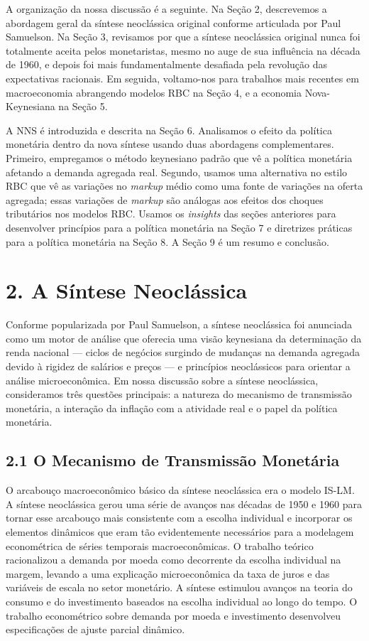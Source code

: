 \documentclass[12pt]{article}
\begin{document}
A organização da nossa discussão é a seguinte. Na Seção 2, descrevemos a abordagem geral da síntese neoclássica original conforme articulada por Paul Samuelson. Na Seção 3, revisamos por que a síntese neoclássica original nunca foi totalmente aceita pelos monetaristas, mesmo no auge de sua influência na década de 1960, e depois foi mais fundamentalmente desafiada pela revolução das expectativas racionais. Em seguida, voltamo-nos para trabalhos mais recentes em macroeconomia abrangendo modelos RBC na Seção 4, e a economia Nova-Keynesiana na Seção 5.

A NNS é introduzida e descrita na Seção 6. Analisamos o efeito da política monetária dentro da nova síntese usando duas abordagens complementares. Primeiro, empregamos o método keynesiano padrão que vê a política monetária afetando a demanda agregada real. Segundo, usamos uma alternativa no estilo RBC que vê as variações no \textit{markup} médio como uma fonte de variações na oferta agregada; essas variações de \textit{markup} são análogas aos efeitos dos choques tributários nos modelos RBC. Usamos os \textit{insights} das seções anteriores para desenvolver princípios para a política monetária na Seção 7 e diretrizes práticas para a política monetária na Seção 8. A Seção 9 é um resumo e conclusão.

\section{2. A Síntese Neoclássica}

Conforme popularizada por Paul Samuelson, a síntese neoclássica foi anunciada como um motor de análise que oferecia uma visão keynesiana da determinação da renda nacional — ciclos de negócios surgindo de mudanças na demanda agregada devido à rigidez de salários e preços — e princípios neoclássicos para orientar a análise microeconômica. Em nossa discussão sobre a síntese neoclássica, consideramos três questões principais: a natureza do mecanismo de transmissão monetária, a interação da inflação com a atividade real e o papel da política monetária.

\subsection{2.1 O Mecanismo de Transmissão Monetária}

O arcabouço macroeconômico básico da síntese neoclássica era o modelo IS-LM. A síntese neoclássica gerou uma série de avanços nas décadas de 1950 e 1960 para tornar esse arcabouço mais consistente com a escolha individual e incorporar os elementos dinâmicos que eram tão evidentemente necessários para a modelagem econométrica de séries temporais macroeconômicas. O trabalho teórico racionalizou a demanda por moeda como decorrente da escolha individual na margem, levando a uma explicação microeconômica da taxa de juros e das variáveis de escala no setor monetário. A síntese estimulou avanços na teoria do consumo e do investimento baseados na escolha individual ao longo do tempo. O trabalho econométrico sobre demanda por moeda e investimento desenvolveu especificações de ajuste parcial dinâmico.
\end{document}
